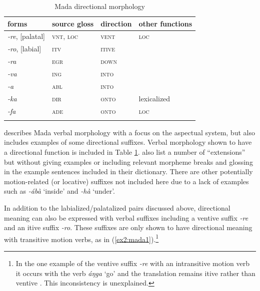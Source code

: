 \begin{table}[H]
	\caption{Mada directional morphology}
	\label{tab:mada}
	\begin{tabular}{llll} %
		\lsptoprule
		forms & source gloss & direction  & other functions  \\ %
		\midrule
		\textit{-re}, [palatal]  &  \textsc{vnt}, \textsc{loc}  &  \textsc{vent} &  \textsc{loc}  \\
		\textit{-ro}, [labial]  &  \textsc{itv}  & \textsc{itive}  &    \\
		\textit{-ra}  &  \textsc{egr}  &   \textsc{down}  &    \\
		\textit{-va}  &  \textsc{ing}  &    \textsc{into} &   \\
		\textit{-a}  &  \textsc{abl}  &   \textsc{into}   &    \\	
		\textit{-ka}  &  \textsc{dir}  &   \textsc{onto}  &   lexicalized  \\		
		\textit{-fa}  &  \textsc{ade}  &   \textsc{onto}  &   \textsc{loc}  \\	
		\lspbottomrule
	\end{tabular}
\end{table} 

\citet{ernstkurdiTenseAspectMood2016} describes Mada verbal morphology with a focus on the aspectual system, but also includes examples of some directional suffixes. Verbal morphology shown to have a directional function is included in Table \ref{tab:mada}. \citet[49]{barreteau2000dictionnaire} also list a number of ``extensions'' but without giving examples or including relevant morpheme breaks and glossing in the example sentences included in their dictionary. There are other potentially motion-related (or locative) suffixes not included here due to a lack of examples such as \textit{-ábà} `inside' and \textit{-hà} `under'.

In addition to the labialized/palatalized pairs discussed above, directional meaning can also be expressed with verbal suffixes including a ventive suffix \textit{-re} and an itive suffix \textit{-ro}. These suffixes are only shown to have directional meaning with transitive motion verbs, as in (\ref{ex2:mada1}).\footnote{In the one example of the ventive suffix \textit{-re} with an intransitive motion verb it occurs with the verb \textit{áŋga} `go' and the translation remains itive rather than ventive \citep[74]{ernstkurdiTenseAspectMood2016}. This inconsistency is unexplained.}

